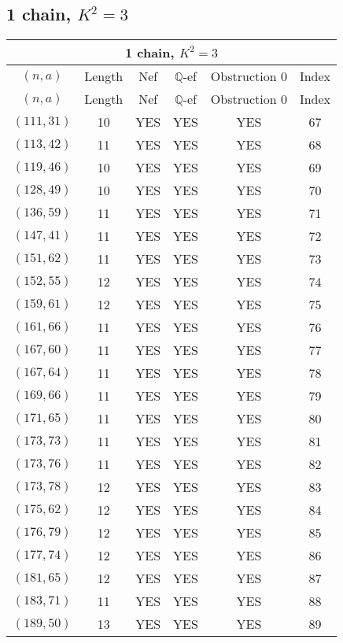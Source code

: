 \subsection{1 chain, $K^2 = 3$}
\begin{longtable}{|c|c|c|c|c|c|}
\hline
\multicolumn{6}{|c|}{1 chain, $K^2 = 3$}\\
\hline
$(n,a)$ & Length & Nef & $\mathbb Q$-ef & Obstruction 0 & Index\\
\hline
\endfirsthead

\hline
$(n,a)$ & Length & Nef & $\mathbb Q$-ef & Obstruction 0 & Index\\
\hline
\endhead
\hline
\endfoot

$(111, 31)$ & 10 & YES & YES & YES & 67\\
$(113, 42)$ & 11 & YES & YES & YES & 68\\
$(119, 46)$ & 10 & YES & YES & YES & 69\\
$(128, 49)$ & 10 & YES & YES & YES & 70\\
$(136, 59)$ & 11 & YES & YES & YES & 71\\
$(147, 41)$ & 11 & YES & YES & YES & 72\\
$(151, 62)$ & 11 & YES & YES & YES & 73\\
$(152, 55)$ & 12 & YES & YES & YES & 74\\
$(159, 61)$ & 12 & YES & YES & YES & 75\\
$(161, 66)$ & 11 & YES & YES & YES & 76\\
$(167, 60)$ & 11 & YES & YES & YES & 77\\
$(167, 64)$ & 11 & YES & YES & YES & 78\\
$(169, 66)$ & 11 & YES & YES & YES & 79\\
$(171, 65)$ & 11 & YES & YES & YES & 80\\
$(173, 73)$ & 11 & YES & YES & YES & 81\\
$(173, 76)$ & 11 & YES & YES & YES & 82\\
$(173, 78)$ & 12 & YES & YES & YES & 83\\
$(175, 62)$ & 12 & YES & YES & YES & 84\\
$(176, 79)$ & 12 & YES & YES & YES & 85\\
$(177, 74)$ & 12 & YES & YES & YES & 86\\
$(181, 65)$ & 12 & YES & YES & YES & 87\\
$(183, 71)$ & 11 & YES & YES & YES & 88\\
$(189, 50)$ & 13 & YES & YES & YES & 89\\

\end{longtable}
